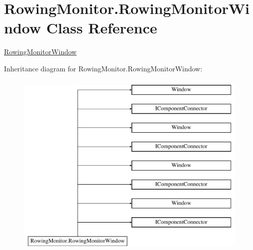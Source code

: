\hypertarget{class_rowing_monitor_1_1_rowing_monitor_window}{}\section{Rowing\+Monitor.\+Rowing\+Monitor\+Window Class Reference}
\label{class_rowing_monitor_1_1_rowing_monitor_window}


\hyperlink{class_rowing_monitor_1_1_rowing_monitor_window}{Rowing\+Monitor\+Window}  


Inheritance diagram for Rowing\+Monitor.\+Rowing\+Monitor\+Window\+:\begin{figure}[H]
\begin{center}
\leavevmode
\includegraphics[height=9.000000cm]{class_rowing_monitor_1_1_rowing_monitor_window}
\end{center}
\end{figure}
